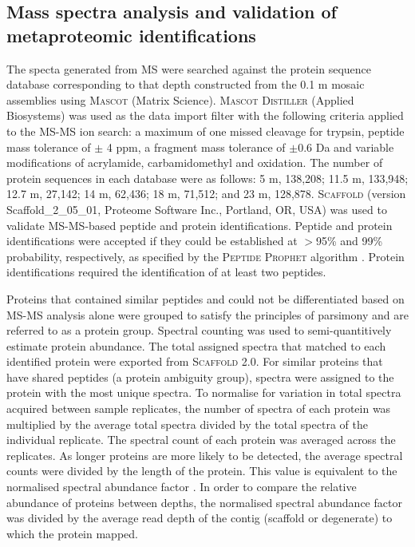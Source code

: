 \subsection{Mass spectra analysis and validation of metaproteomic identifications}
The specta generated from \ac{MS} were searched against the protein sequence database corresponding to that depth constructed from the 0.1 \textmu{}m mosaic assemblies using \textsc{Mascot} (Matrix Science).
\textsc{Mascot Distiller} (Applied Biosystems) was used as the data import filter with the following criteria applied to the \ac{MS-MS} ion search: a maximum of one missed cleavage for trypsin, peptide mass tolerance of $\pm$ 4 ppm, a fragment mass tolerance of $\pm$0.6 Da and variable modifications of acrylamide, carbamidomethyl and oxidation.
The number of protein sequences in each database were as follows: 5 m, 138,208; 11.5 m, 133,948; 12.7 m, 27,142; 14 m, 62,436; 18 m, 71,512; and 23 m, 128,878. 
\textsc{Scaffold} (version Scaffold\_2\_05\_01, Proteome Software Inc., Portland, \textsc{OR}, \textsc{USA}) was used to validate \ac{MS-MS}-based peptide and protein identifications. 
Peptide and protein identifications were accepted if they could be established at $>$95\% and 99\% probability, respectively, as specified by the \textsc{Peptide Prophet} algorithm \cite{Keller2002}. 
Protein identifications required the identification of at least two peptides.
 
Proteins that contained similar peptides and could not be differentiated based on \ac{MS-MS} analysis alone were grouped to satisfy the principles of parsimony and are referred to as a protein group. 
Spectral counting was used to semi-quantitively estimate protein abundance. 
The total assigned spectra that matched to each identified protein were exported from \textsc{Scaffold} 2.0. 
For similar proteins that have shared peptides (a protein ambiguity group), spectra were assigned to the protein with the most unique spectra. 
To normalise for variation in total spectra acquired between sample replicates, the number of spectra of each protein was multiplied by the average total spectra divided by the total spectra of the individual replicate. 
The spectral count of each protein was averaged across the replicates. 
As longer proteins are more likely to be detected, the average spectral counts were divided by the length of the protein. 
This value is equivalent to the normalised spectral abundance factor \cite{Florens2006, Zybailov2006}. 
In order to compare the relative abundance of proteins between depths, the normalised spectral abundance factor was divided by the average read depth of the contig (scaffold or degenerate) to which the protein mapped. 

